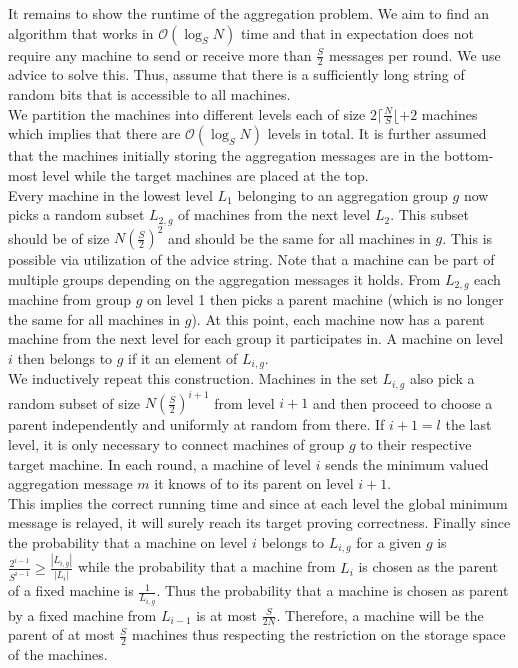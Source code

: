 \documentclass[a4paper, 12pt]{article}
\theoremstyle{plain}
\theoremstyle{definition}
\theoremstyle{lemma}
\theoremstyle{remark}
\theoremstyle{corollary}
\theoremstyle{example}
\begin{document}
	It remains to show the runtime of the aggregation problem. We aim to find an algorithm that works in $\mathcal{O}(\log_S N)$ time and that in expectation does not require any machine to send or receive more than $\frac{S}{2}$ messages per round. We use advice to solve this. Thus, assume that there is a sufficiently long string of random bits that is accessible to all machines.\\
	We partition the machines into different levels each of size $2\lceil\frac{N}{S}\lfloor+2$ machines which implies that there are $\mathcal{O}(\log_S N)$ levels in total. It is further assumed that the machines initially storing the aggregation messages are in the bottom-most level while the target machines are placed at the top.\\
	Every machine in the lowest level $L_1$ belonging to an aggregation group $g$ now picks a random subset $L_{2,g}$ of machines from the next level $L_2$. This subset should be of size $N\left(\frac{S}{2}\right)^2$ and should be the same for all machines in $g$. This is possible via utilization of the advice string. Note that a machine can be part of multiple groups depending on the aggregation messages it holds. From $L_{2,g}$ each machine from group $g$ on level 1 then picks a parent machine (which is no longer the same for all machines in $g$). At this point, each machine now has a parent machine from the next level for each group it participates in. A machine on level $i$ then belongs to $g$ if it an element of $L_{i,g}$.\\
	We inductively repeat this construction. Machines in the set $L_{i,g}$ also pick a random subset of size $N\left(\frac{S}{2}\right)^{i+1}$ from level $i+1$ and then proceed to choose a parent independently and uniformly at random from there. If $i+1=l$ the last level, it is only necessary to connect machines of group $g$ to their respective target machine. In each round, a machine of level $i$ sends the minimum valued aggregation message $m$ it knows of to its parent on level $i+1$.\\
	This implies the correct running time and since at each level the global minimum message is relayed, it will surely reach its target proving correctness. Finally since the probability that a machine on level $i$ belongs to $L_{i,g}$ for a given $g$ is $\frac{2^{i-1}}{S^{i-1}} \geq \frac{\left|L_{i,g}\right|}{\left|L_i\right|}$ while the probability that a machine from $L_i$ is chosen as the parent of a fixed machine is $\frac{1}{L_{i,g}}$. Thus the probability that a machine is chosen as parent by a fixed machine from $L_{i-1}$ is at most $\frac{S}{2N}$. Therefore, a machine will be the parent of at most $\frac{S}{2}$ machines thus respecting the restriction on the storage space of the machines.
\end{document}
